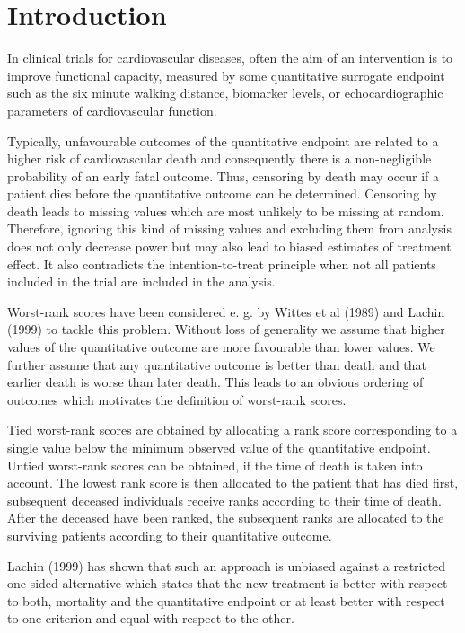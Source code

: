 \documentclass[bimj,fleqn]{w-art}\usepackage[]{graphicx}\usepackage[]{color}
\theoremstyle{plain}
\theoremstyle{definition}
\begin{document}



\section{Introduction}
\label{sec:Intro}

In clinical trials for cardiovascular diseases, often the aim of an
intervention is to improve functional capacity, measured by some quantitative
surrogate endpoint such as the six minute walking distance, biomarker levels,
or echocardiographic parameters of cardiovascular function.

Typically, unfavourable outcomes of the quantitative endpoint are related to a
higher risk of cardiovascular death and consequently there is a non-negligible
probability of an early fatal outcome. Thus, censoring by
death may occur if a patient dies before the quantitative outcome can be
determined. Censoring by death leads to missing values which are most unlikely
to be missing at random. Therefore, ignoring this kind of missing values and
excluding them from analysis does not only decrease power but may also lead to
biased estimates of treatment effect. It also contradicts the
intention-to-treat principle when not all patients included in the trial are
included in the analysis.

Worst-rank scores have been considered e. g. by Wittes et al (1989) and Lachin
(1999) to tackle this problem. Without loss of generality we assume that
higher values of the quantitative outcome are more favourable than lower
values. We further assume that any quantitative outcome is better than death
and that earlier death is worse than later death. This leads to an obvious
ordering of outcomes which motivates the definition of worst-rank scores.

Tied worst-rank scores are obtained by allocating a rank score corresponding
to a single value below the minimum observed value of the quantitative
endpoint. Untied worst-rank scores can be obtained, if the time of death is
taken into account. The lowest rank score is then allocated to the patient
that has died first, subsequent deceased individuals receive ranks according
to their time of death. After the deceased have been ranked, the subsequent
ranks are allocated to the surviving patients according to their quantitative
outcome.

Lachin (1999) has shown that such an approach is unbiased against a restricted
one-sided alternative which states that the new treatment is better with
respect to both, mortality and the quantitative endpoint or at least better
with respect to one criterion and equal with respect to the other.
\end{document}
